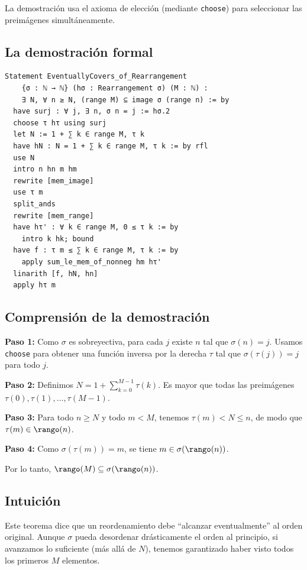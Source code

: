 La demostración usa el axioma de elección (mediante \texttt{choose}) para seleccionar las preimágenes simultáneamente.

\subsection{La demostración formal}

\begin{verbatim}
Statement EventuallyCovers_of_Rearrangement
    {σ : ℕ → ℕ} (hσ : Rearrangement σ) (M : ℕ) :
    ∃ N, ∀ n ≥ N, (range M) ⊆ image σ (range n) := by
  have surj : ∀ j, ∃ n, σ n = j := hσ.2
  choose τ hτ using surj
  let N := 1 + ∑ k ∈ range M, τ k
  have hN : N = 1 + ∑ k ∈ range M, τ k := by rfl
  use N
  intro n hn m hm
  rewrite [mem_image]
  use τ m
  split_ands
  rewrite [mem_range]
  have hτ' : ∀ k ∈ range M, 0 ≤ τ k := by
    intro k hk; bound
  have f : τ m ≤ ∑ k ∈ range M, τ k := by
    apply sum_le_mem_of_nonneg hm hτ'
  linarith [f, hN, hn]
  apply hτ m
\end{verbatim}

\subsection{Comprensión de la demostración}

\textbf{Paso 1:} Como $\sigma$ es sobreyectiva, para cada $j$ existe $n$ tal que $\sigma(n) = j$. Usamos \texttt{choose} para obtener una función inversa por la derecha $\tau$ tal que $\sigma(\tau(j)) = j$ para todo $j$.

\textbf{Paso 2:} Definimos $N = 1 + \sum_{k=0}^{M-1} \tau(k)$. Es mayor que todas las preimágenes $\tau(0), \tau(1), \dots, \tau(M-1)$.

\textbf{Paso 3:} Para todo $n \ge N$ y todo $m < M$, tenemos $\tau(m) < N \le n$, de modo que $\tau(m) \in \rango(n)$.

\textbf{Paso 4:} Como $\sigma(\tau(m)) = m$, se tiene $m \in \sigma(\rango(n))$.

Por lo tanto, $\rango(M) \subseteq \sigma(\rango(n))$.

\subsection{Intuición}

Este teorema dice que un reordenamiento debe ``alcanzar eventualmente'' al orden original. Aunque $\sigma$ pueda desordenar drásticamente el orden al principio, si avanzamos lo suficiente (más allá de $N$), tenemos garantizado haber visto todos los primeros $M$ elementos.

